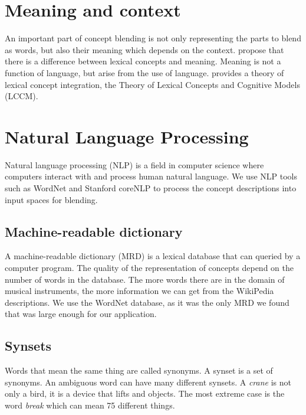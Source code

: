 

\section{Meaning and context}
An important part of concept blending is not only representing the parts to blend as words, but also their meaning which depends on the context. \parencite{Reference6} propose that there is a difference between lexical concepts and meaning. Meaning is not a function of language, but arise from the use of language. \parencite{Reference6} provides a theory of lexical concept integration, the Theory of Lexical Concepts and Cognitive Models (LCCM). 




\section{Natural Language Processing}
Natural language processing (NLP) is a field in computer science where computers interact with and process human natural language.
We use NLP tools such as WordNet and Stanford coreNLP to process the concept descriptions into input spaces for blending.

\subsection{Machine-readable dictionary}
A machine-readable dictionary (MRD) is a lexical database that can queried by a computer program.
The quality of the representation of concepts depend on the number of words in the database.
The more words there are in the domain of musical instruments, the more information we can get from the WikiPedia descriptions.
We use the WordNet database, as it was the only MRD we found that was large enough for our application. \parencite{fellbaum1998wordnet}

\subsection{Synsets}
Words that mean the same thing are called synonyms. A synset is a set of synonyms. An ambiguous word can have many different synsets. A \emph{crane} is not only a bird, it is a device that lifts and objects. The most extreme case is the word \emph{break} which can mean 75 different things.

